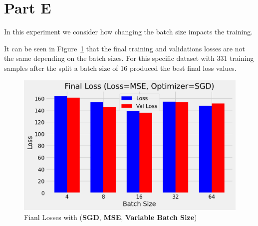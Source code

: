 \newpage
\section{Part E}
\label{sec:sec_e}

In this experiment we consider how changing the batch size impacts the training. 


It can be seen in Figure~\ref{fig:e loss} that the final training and validations losses are not the same depending on the batch sizes. For this specific dataset with 331 training samples after the split a batch size of 16 produced the best final loss values.
\begin{figure}[htpb]
	\centering
	\includegraphics[width=\columnwidth]{figures/e_loss.png}
	\caption{Fianl Losses with (\textbf{SGD}, \textbf{MSE}, \textbf{Variable Batch Size})}
	\label{fig:e loss}
\end{figure}